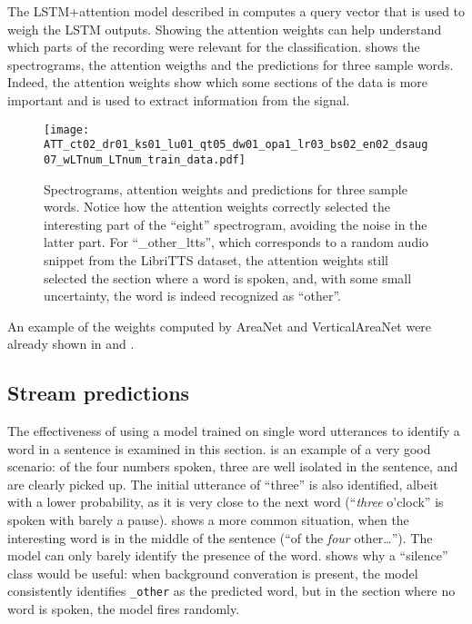 
The LSTM+attention model described in  computes a query
vector that is used to weigh the LSTM outputs. Showing the attention weights
can help understand which parts of the recording were relevant for the
classification.
 shows the spectrograms, the attention
weigths and the predictions for three sample words.
Indeed, the attention weights show which some sections of the data is more important
and is used to extract information from the signal.

\begin{figure*}[t!]
    \centering
    \texttt{[image: ATT\_ct02\_dr01\_ks01\_lu01\_qt05\_dw01\_opa1\_lr03\_bs02\_en02\_dsaug07\_wLTnum\_LTnum\_train\_data.pdf]}
    \caption{Spectrograms, attention weights and predictions for three sample words.
    Notice how the attention weights correctly selected the interesting part of
    the ``eight'' spectrogram, avoiding the noise in the latter part.
    For ``\_other\_ltts'', which corresponds to a random audio snippet from the LibriTTS
    dataset, the attention weights still selected the section where a word is spoken,
    and, with some small uncertainty, the word is indeed recognized as ``other''.}%
    \label{fig:attention_weights_standard}
\end{figure*}

An example of the weights computed by AreaNet and VerticalAreaNet were already shown 
in  and .

\subsection{Stream predictions}

The effectiveness of using a model trained on single word utterances to
identify a word in a sentence is examined in this section.
 is an example of a very good
scenario: of the four numbers spoken, three are well isolated in the sentence,
and are clearly picked up. The initial utterance of ``three'' is also
identified, albeit with a lower probability, as it is very close to the next
word (``\textit{three} o'clock'' is spoken with barely a pause).
 shows a more common situation,
when the interesting word is in the middle of the sentence (``of the
\textit{four} other\ldots''). The model can only barely identify the presence
of the word.
 shows why a ``silence'' class
would be useful: when background converation is present, the model consistently
identifies \texttt{\_other} as the predicted word, but in the section where no
word is spoken, the model fires randomly.


